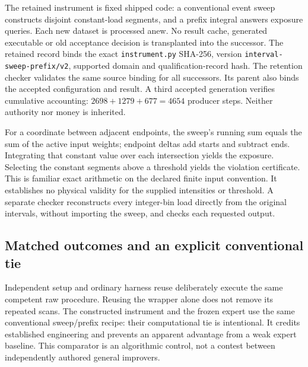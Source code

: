 \documentclass[11pt,letterpaper]{article}
\begin{document}
The retained instrument is fixed shipped code: a conventional event sweep constructs disjoint constant-load segments, and a prefix integral answers exposure queries. Each new dataset is processed anew. No result cache, generated executable or old acceptance decision is transplanted into the successor. The retained record binds the exact \texttt{instrument.py} SHA-256, version \texttt{interval-sweep-prefix/v2}, supported domain and qualification-record hash. The retention checker validates the same source binding for all successors. Its parent also binds the accepted configuration and result. A third accepted generation verifies cumulative accounting: $2698+1279+677=4654$ producer steps. Neither authority nor money is inherited.

For a coordinate between adjacent endpoints, the sweep's running sum equals the sum of the active input weights; endpoint deltas add starts and subtract ends. Integrating that constant value over each intersection yields the exposure. Selecting the constant segments above a threshold yields the violation certificate. This is familiar exact arithmetic on the declared finite input convention. It establishes no physical validity for the supplied intensities or threshold. A separate checker reconstructs every integer-bin load directly from the original intervals, without importing the sweep, and checks each requested output.

\subsection{Matched outcomes and an explicit conventional tie}
Independent setup and ordinary harness reuse deliberately execute the same competent raw procedure. Reusing the wrapper alone does not remove its repeated scans. The constructed instrument and the frozen expert use the same conventional sweep/prefix recipe: their computational tie is intentional. It credits established engineering and prevents an apparent advantage from a weak expert baseline. This comparator is an algorithmic control, not a contest between independently authored general improvers.
\end{document}
